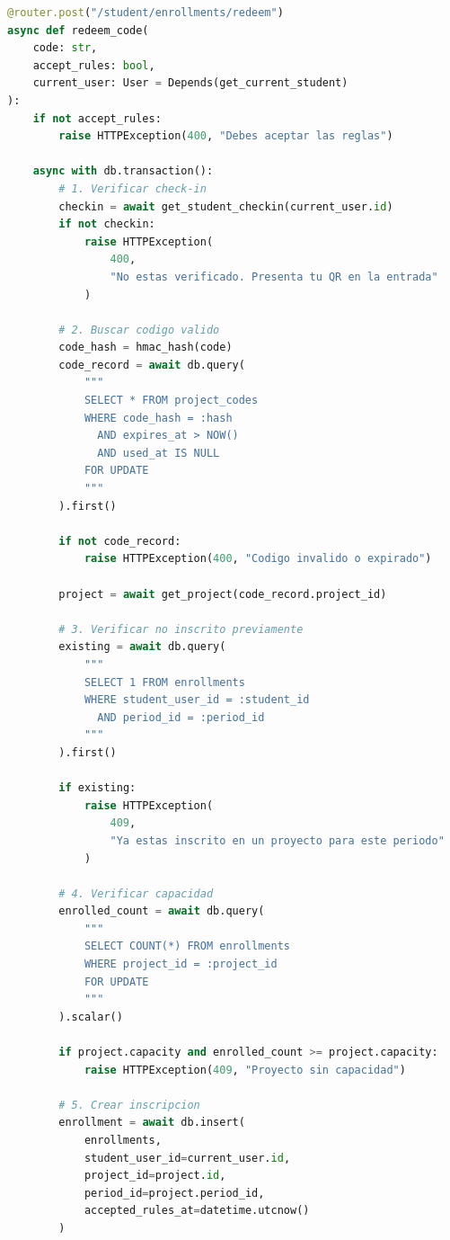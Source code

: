 \documentclass[12pt,a4paper]{article}
\begin{document}
\begin{lstlisting}[language=Python]
@router.post("/student/enrollments/redeem")
async def redeem_code(
    code: str,
    accept_rules: bool,
    current_user: User = Depends(get_current_student)
):
    if not accept_rules:
        raise HTTPException(400, "Debes aceptar las reglas")
    
    async with db.transaction():
        # 1. Verificar check-in
        checkin = await get_student_checkin(current_user.id)
        if not checkin:
            raise HTTPException(
                400, 
                "No estas verificado. Presenta tu QR en la entrada"
            )
        
        # 2. Buscar codigo valido
        code_hash = hmac_hash(code)
        code_record = await db.query(
            """
            SELECT * FROM project_codes
            WHERE code_hash = :hash
              AND expires_at > NOW()
              AND used_at IS NULL
            FOR UPDATE
            """
        ).first()
        
        if not code_record:
            raise HTTPException(400, "Codigo invalido o expirado")
        
        project = await get_project(code_record.project_id)
        
        # 3. Verificar no inscrito previamente
        existing = await db.query(
            """
            SELECT 1 FROM enrollments
            WHERE student_user_id = :student_id
              AND period_id = :period_id
            """
        ).first()
        
        if existing:
            raise HTTPException(
                409,
                "Ya estas inscrito en un proyecto para este periodo"
            )
        
        # 4. Verificar capacidad
        enrolled_count = await db.query(
            """
            SELECT COUNT(*) FROM enrollments
            WHERE project_id = :project_id
            FOR UPDATE
            """
        ).scalar()
        
        if project.capacity and enrolled_count >= project.capacity:
            raise HTTPException(409, "Proyecto sin capacidad")
        
        # 5. Crear inscripcion
        enrollment = await db.insert(
            enrollments,
            student_user_id=current_user.id,
            project_id=project.id,
            period_id=project.period_id,
            accepted_rules_at=datetime.utcnow()
        )
        

\end{lstlisting}
\end{document}
